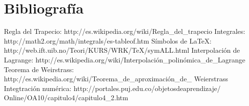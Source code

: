 \documentclass{article}
\begin{document}
	\section{Bibliografía}
		\begin{thebibliography}{99}
				Regla del Trapecio: http://es.wikipedia.org/wiki/Regla\_del\_trapecio
				Integrales: http://math2.org/math/integrals/es-tableof.htm
				Símbolos de \LaTeX: http://web.ift.uib.no/Teori/KURS/WRK/TeX/symALL.html
				Interpolación de Lagrange: http://es.wikipedia.org/wiki/Interpolación\_polinómica\_de\_Lagrange
				Teorema de Weirstrass: http://es.wikipedia.org/wiki/Teorema\_de\_aproximación\_de\_
Weierstrass
				Integtración numérica: http://portales.puj.edu.co/objetosdeaprendizaje/
Online/OA10/capitulo4/capitulo4\_2.htm
 		 \end{thebibliography}
   
\end{document}
